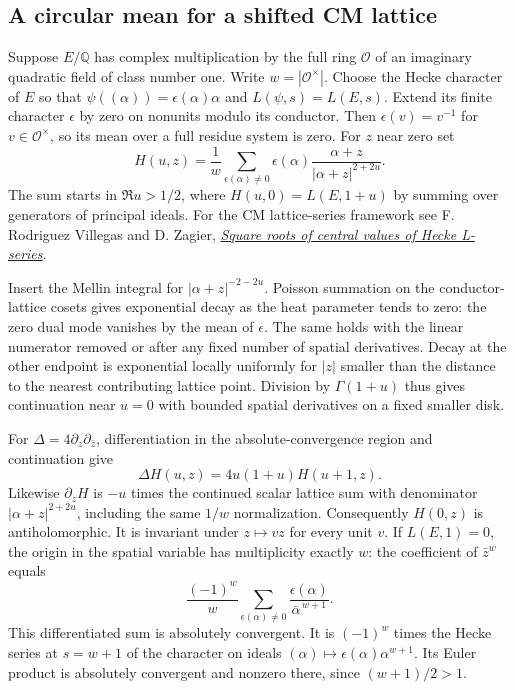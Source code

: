 \documentclass[11pt]{article}
\begin{document}
\subsection*{A circular mean for a shifted CM lattice}
Suppose $E/\mathbb Q$ has complex multiplication by the full ring
$\mathcal O$ of an imaginary quadratic field of class number one.
Write $w=|\mathcal O^\times|$. Choose the Hecke character of $E$ so that
$\psi((\alpha))=\epsilon(\alpha)\alpha$ and $L(\psi,s)=L(E,s)$.
Extend its finite character $\epsilon$ by zero on nonunits modulo its
conductor. Then $\epsilon(v)=v^{-1}$ for $v\in\mathcal O^\times$, so
its mean over a full residue system is zero. For $z$ near zero set
\[
 H(u,z)=\frac1w\sum_{\epsilon(\alpha)\ne0}
       \epsilon(\alpha)\frac{\alpha+z}{|\alpha+z|^{2+2u}}.
\]
The sum starts in $\Re u>1/2$, where $H(u,0)=L(E,1+u)$ by summing
over generators of principal ideals. For the CM lattice-series
framework see F. Rodriguez Villegas and D. Zagier,
\href{https://people.mpim-bonn.mpg.de/zagier/files/mpim/92-68/fulltext.pdf}
{\emph{Square roots of central values of Hecke L-series}}.

Insert the Mellin integral for $|\alpha+z|^{-2-2u}$.
Poisson summation on the conductor-lattice cosets gives exponential
decay as the heat parameter tends to zero: the zero dual mode
vanishes by the mean of $\epsilon$. The same holds with the linear
numerator removed or after any fixed number of spatial derivatives.
Decay at the other endpoint is exponential locally uniformly for
$|z|$ smaller than the distance to the nearest contributing lattice
point. Division by $\Gamma(1+u)$ thus gives continuation near $u=0$
with bounded spatial derivatives on a fixed smaller disk.

For $\Delta=4\partial_z\partial_{\bar z}$, differentiation in the
absolute-convergence region and continuation give
\[
 \Delta H(u,z)=4u(1+u)H(u+1,z).
\]
Likewise $\partial_z H$ is $-u$ times the continued scalar lattice
sum with denominator $|\alpha+z|^{2+2u}$, including the same
$1/w$ normalization. Consequently $H(0,z)$ is antiholomorphic.
It is invariant under $z\mapsto vz$ for every unit $v$.
If $L(E,1)=0$, the origin in the spatial variable has multiplicity
exactly $w$: the coefficient of $\bar z^w$ equals
\[
 \frac{(-1)^w}{w}\sum_{\epsilon(\alpha)\ne0}
       \frac{\epsilon(\alpha)}{\bar\alpha^{\,w+1}} .
\]
This differentiated sum is absolutely convergent. It is $(-1)^w$
times the Hecke series at $s=w+1$ of the character on ideals
$(\alpha)\mapsto\epsilon(\alpha)\alpha^{w+1}$. Its Euler product is
absolutely convergent and nonzero there, since $(w+1)/2>1$.
\end{document}
